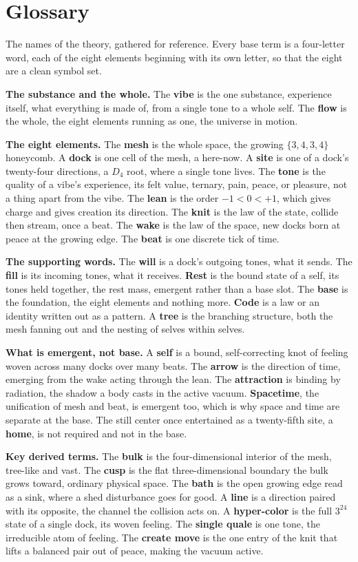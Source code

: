 \section{Glossary}
\label{app:glossary}

The names of the theory, gathered for reference. Every base term is a four-letter word, each of the eight elements beginning with its own letter, so that the eight are a clean symbol set.

\textbf{The substance and the whole.} The \textbf{vibe} is the one substance, experience itself, what everything is made of, from a single tone to a whole self. The \textbf{flow} is the whole, the eight elements running as one, the universe in motion.

\textbf{The eight elements.} The \textbf{mesh} is the whole space, the growing $\{3,4,3,4\}$ honeycomb. A \textbf{dock} is one cell of the mesh, a here-now. A \textbf{site} is one of a dock's twenty-four directions, a $D_4$ root, where a single tone lives. The \textbf{tone} is the quality of a vibe's experience, its felt value, ternary, pain, peace, or pleasure, not a thing apart from the vibe. The \textbf{lean} is the order $-1 < 0 < +1$, which gives charge and gives creation its direction. The \textbf{knit} is the law of the state, collide then stream, once a beat. The \textbf{wake} is the law of the space, new docks born at peace at the growing edge. The \textbf{beat} is one discrete tick of time.

\textbf{The supporting words.} The \textbf{will} is a dock's outgoing tones, what it sends. The \textbf{fill} is its incoming tones, what it receives. \textbf{Rest} is the bound state of a self, its tones held together, the rest mass, emergent rather than a base slot. The \textbf{base} is the foundation, the eight elements and nothing more. \textbf{Code} is a law or an identity written out as a pattern. A \textbf{tree} is the branching structure, both the mesh fanning out and the nesting of selves within selves.

\textbf{What is emergent, not base.} A \textbf{self} is a bound, self-correcting knot of feeling woven across many docks over many beats. The \textbf{arrow} is the direction of time, emerging from the wake acting through the lean. The \textbf{attraction} is binding by radiation, the shadow a body casts in the active vacuum. \textbf{Spacetime}, the unification of mesh and beat, is emergent too, which is why space and time are separate at the base. The still center once entertained as a twenty-fifth site, a \textbf{home}, is not required and not in the base.

\textbf{Key derived terms.} The \textbf{bulk} is the four-dimensional interior of the mesh, tree-like and vast. The \textbf{cusp} is the flat three-dimensional boundary the bulk grows toward, ordinary physical space. The \textbf{bath} is the open growing edge read as a sink, where a shed disturbance goes for good. A \textbf{line} is a direction paired with its opposite, the channel the collision acts on. A \textbf{hyper-color} is the full $3^{24}$ state of a single dock, its woven feeling. The \textbf{single quale} is one tone, the irreducible atom of feeling. The \textbf{create move} is the one entry of the knit that lifts a balanced pair out of peace, making the vacuum active.
